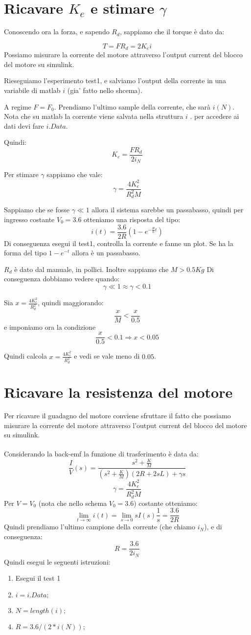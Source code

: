 \documentclass[10pt,a4paper]{article}
\begin{document}
\section{Ricavare $K_e$ e stimare $\gamma$}
Conoscendo ora la forza, e sapendo $R_d$, sappiamo che il torque è dato da:

$$T = FR_d = 2K_e i$$
Possiamo misurare la corrente del motore attraverso l'output current del blocco del motore su simulink.

Rieseguiamo l'esperimento test1, e salviamo l'output della corrente in una variabile di matlab $i$ (gia' fatto nello shcema).

A regime $F=F_0$. Prendiamo l'ultimo sample della corrente, che sarà $i(N)$. Nota che su matlab la corrente viene salvata nella struttura $i$ . per accedere ai dati devi fare $i.Data$.

 Quindi:
$$K_e = \frac{FR_d}{2i_N}$$

Per stimare $\gamma$ sappiamo che vale:
$$\gamma = \frac{4K_e^2}{R_d^2M}$$

Sappiamo che se fosse $\gamma \ll 1$ allora il sistema sarebbe un passabasso, quindi per ingresso costante $V_0=3.6$ otteniamo una risposta del tipo:
$$i(t) = \frac{3.6}{2R}(1-e^{-\frac{R}{L}t})$$
Di conseguenza esegui il test1, controlla la corrente e fanne un plot. Se ha la forma del tipo $1-e^{-t}$ allora è un passabasso.

$R_d$ è dato dal manuale, in pollici. Inoltre sappiamo che $M > 0.5Kg$
Di conseguenza dobbiamo vedere quando:
$$\gamma \ll 1 \approx \gamma < 0.1$$

Sia $ x= \frac{4K_e^2}{R_d^2}$, quindi maggiorando:
$$ \frac{x}{M} < \frac{x}{0.5}$$
e imponiamo ora la condizione
$$\frac{x}{0.5}<0.1 \Rightarrow x < 0.05$$

Quindi calcola $ x= \frac{4K_e^2}{R_d^2}$ e vedi se vale meno di $0.05$.

\newpage
\section{Ricavare la resistenza del motore}
Per ricavare il guadagno del motore conviene sfruttare il fatto che possiamo misurare la corrente del motore attraverso l'output current del blocco del motore su simulink. \\ \\
Considerando la back-emf la funzione di trasferimento è data da:
$$\frac{I}{V}(s) = \frac{s^2+\frac{K}{M}}{(s^2+\frac{K}{M})(2R+2sL)+\gamma s}$$
$$\gamma = \frac{4K_e^2}{R_d^2M}$$
Per $V=V_0$ (nota che nello schema $V_0=3.6$) costante otteniamo:
$$\lim_{t \to \infty} i(t) = \lim_{s \to 0} sI(s)\frac{1}{s} = \frac{3.6}{2R}$$
Quindi prendiamo l'ultimo campione della corrente (che chiamo $i_N$), e di conseguenza:
$$R = \frac{3.6}{2i_N}$$
Quindi esegui le seguenti istruzioni:
\begin{enumerate}
\item Esegui il test 1
\item $i=i.Data;$
\item $N=length(i);$
\item $ R = 3.6/(2*i(N));$
\end{enumerate}
\end{document}
